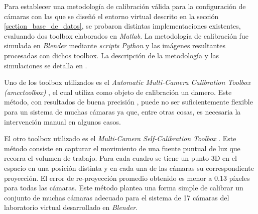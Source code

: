  Para establecer una metodología de calibración válida para la configuración de cámaras con las que se diseñó el entorno virtual descrito en la sección \ref{section_base_de_datos}, se probaron distintas implementaciones existentes, evaluando dos toolbox elaborados en \emph{Matlab}. La metodología de calibración fue simulada en \emph{Blender} mediante \textit{scripts} \emph{Python} y las imágenes resultantes procesadas con dichos toolbox. La descripción de la metodología y las simulaciones se detalla en \cite{proyecto_biomecanica}.\
 
 Uno de los toolbox utilizados es el \textit{Automatic Multi-Camera Calibration Toolbox (amcctoolbox)} \cite{amcctoolbox}, el cual utiliza como objeto de calibración un damero. Este método, con resultados de buena precisión \cite{zhang_libro}, puede no ser suficientemente flexible para un sistema de muchas cámaras ya que, entre otras cosas, es necesaria la intervención manual en algunos casos.\
 
El otro toolbox utilizado es el \textit{Multi-Camera Self-Calibration Toolbox} \cite{toolbox_led}. Este método consiste en capturar el movimiento de una fuente puntual de luz que recorra el volumen de trabajo. Para cada cuadro se tiene un punto 3D en el espacio en una posición distinta y en cada una de las cámaras su correspondiente proyección.
 El error de re-proyección promedio obtenido es menor a 0.13 píxeles para todas las cámaras. Este método plantea una forma simple de calibrar un conjunto de muchas cámaras adecuado para el sistema de 17 cámaras del laboratorio virtual desarrollado en \emph{Blender}.

 
